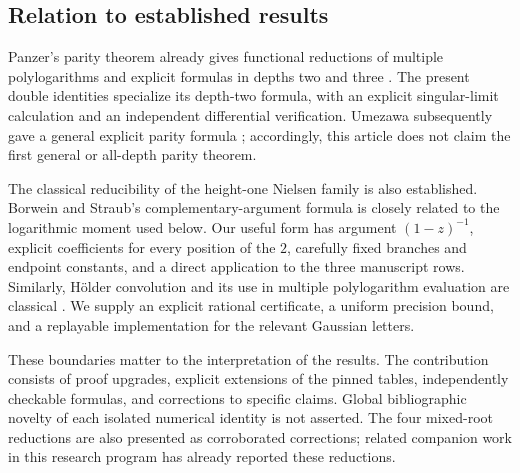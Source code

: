 \subsection{Relation to established results}

Panzer's parity theorem already gives functional reductions of multiple
polylogarithms and explicit formulas in depths two and three
\cite{Panzer2017}. The present double identities specialize its depth-two
formula, with an explicit singular-limit calculation and an independent
differential verification. Umezawa subsequently gave a general explicit
parity formula \cite{Umezawa2025}; accordingly, this article does not claim
the first general or all-depth parity theorem.

The classical reducibility of the height-one Nielsen family is also
established. Borwein and Straub's complementary-argument formula
\cite[Eq.~(33)]{BorweinStraub2015} is closely related to the logarithmic
moment used below. Our useful form has argument $(1-z)^{-1}$, explicit
coefficients for every position of the $2$, carefully fixed branches and
endpoint constants, and a direct application to the three manuscript
rows. Similarly, H\"older convolution and its use in multiple
polylogarithm evaluation are classical \cite{BBBL2001,VollingaWeinzierl2005}.
We supply an explicit rational certificate, a uniform precision bound,
and a replayable implementation for the relevant Gaussian letters.

These boundaries matter to the interpretation of the results. The
contribution consists of proof upgrades, explicit extensions of the
pinned tables, independently checkable formulas, and corrections to
specific claims. Global bibliographic novelty of each isolated numerical
identity is not asserted. The four mixed-root reductions are also
presented as corroborated corrections; related companion work in this
research program has already reported these reductions.

